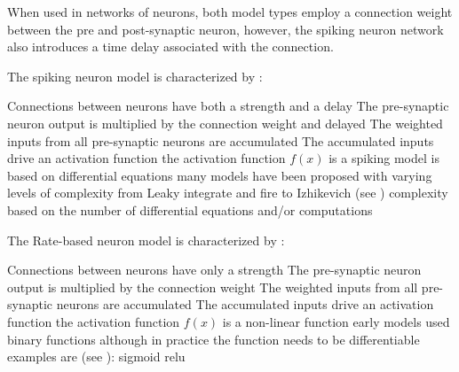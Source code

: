 When used in networks of neurons, both model types employ a connection weight between the pre and post-synaptic neuron, however, the spiking neuron network also introduces a time delay associated with the connection.

The spiking neuron model is characterized by \cite{paugam2012computing}:

\begin{outline}
        \1 Connections between neurons have both a strength and a delay
          \2 The pre-synaptic neuron output is multiplied by the connection weight and delayed 
        \1 The weighted inputs from all pre-synaptic neurons are accumulated
        \1 The accumulated inputs drive an activation function
          \2 the activation function $f(x)$ is a spiking model is based on differential equations
          \2 many models have been proposed with varying levels of complexity
              \3 from Leaky integrate and fire \cite{Brunel2007} to Izhikevich \cite{Iz2005} (see )
              \3 complexity based on the number of differential equations and/or computations
         
\end{outline}

The Rate-based neuron model is characterized by \cite{NNintro_Bullinaria}:
\begin{outline}
        \1 Connections between neurons have only a strength
          \2 The pre-synaptic neuron output is multiplied by the connection weight
        \1 The weighted inputs from all pre-synaptic neurons are accumulated
        \1 The accumulated inputs drive an activation function
          \2 the activation function $f(x)$ is a non-linear function
          \2 early models used binary functions although in practice the function needs to be differentiable
            \3 examples are (see ):
              \4 sigmoid \cite{paugam2012computing}
              \4 \ac{relu} \cite{maas2013rectifier}
\end{outline}

